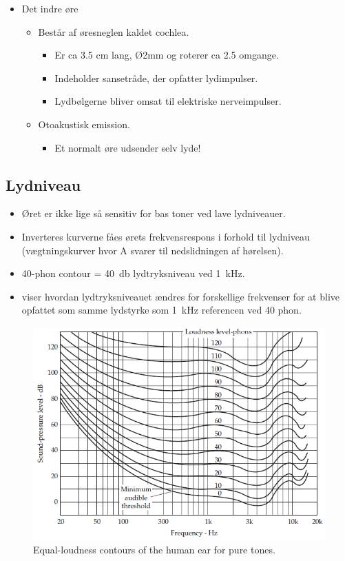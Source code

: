 \begin{itemize}
	\item Det indre øre
	\begin{itemize}
		\item Består af øresneglen kaldet cochlea.
		\begin{itemize}
			\item Er ca 3.5 cm lang, Ø2mm og roterer ca 2.5 omgange.
			\item Indeholder sansetråde, der opfatter lydimpulser. 
			\item Lydbølgerne bliver omsat til elektriske nerveimpulser. 
		\end{itemize}
		\item Otoakustisk emission.
		\begin{itemize}
			\item Et normalt øre udsender selv lyde!
		\end{itemize}
	\end{itemize}
\end{itemize}

\subsection{Lydniveau}
\begin{itemize}
	\item Øret er ikke lige så sensitiv for bas toner ved lave lydniveauer.
	\item Inverteres kurverne fåes ørets frekvensrespons i forhold til lydniveau (vægtningskurver hvor A svarer til nedslidningen af hørelsen).
	\item 40-phon contour = \SI{40}{\decibel} lydtryksniveau ved \SI{1}{\kilo\hertz}.
	\item {} viser hvordan lydtryksniveauet ændres for forskellige frekvenser for at blive opfattet som samme lydstyrke som \SI{1}{\kilo\hertz} referencen ved 40 phon.
\end{itemize}

\begin{figure} [H]
	\centering
	\includegraphics[width=\linewidth]{graphics/42.png}
	\caption{Equal-loudness contours of the human ear for pure tones.}
	\label{fig:42}
\end{figure}

